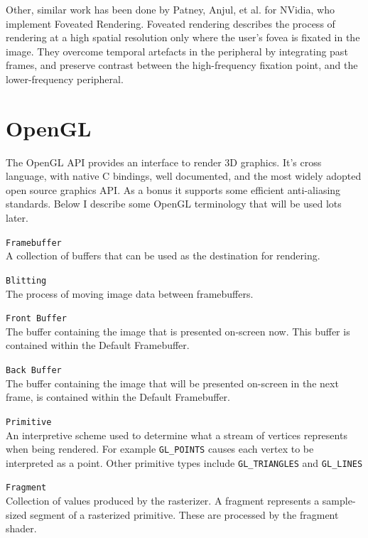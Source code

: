 \documentclass[12pt,a4paper,twoside,openright]{report}
\begin{document}
Other, similar work has been done by Patney, Anjul, et al. \cite{patney2016towards} for NVidia, who implement Foveated Rendering. Foveated rendering describes the process of rendering at a high spatial resolution only where the user's fovea is fixated in the image. They overcome temporal artefacts in the peripheral by integrating past frames, and preserve contrast between the high-frequency fixation point, and the lower-frequency peripheral.

\section{OpenGL}

The OpenGL API provides an interface to render 3D graphics. It's cross language, with native C bindings, well documented, and the most widely adopted open source graphics API. As a bonus it supports some efficient anti-aliasing standards. Below I describe some OpenGL terminology that will be used lots later.

\begin{description}

\item\texttt{Framebuffer} \\
  A collection of buffers that can be used as the destination for rendering.

\item\texttt{Blitting} \\
  The process of moving image data between framebuffers.

\item\texttt{Front Buffer} \\
  The buffer containing the image that is presented on-screen now. This buffer is contained within the Default Framebuffer.

\item\texttt{Back Buffer} \\
  The buffer containing the image that will be presented on-screen in the next frame, is contained within the Default Framebuffer. 

\item\texttt{Primitive} \\
  An interpretive scheme used to determine what a stream of vertices represents when being rendered. For example \texttt{GL\_POINTS} causes each vertex to be interpreted as a point. Other primitive types include \texttt{GL\_TRIANGLES} and \texttt{GL\_LINES}
\item\texttt{Fragment} \\
  Collection of values produced by the rasterizer. A fragment represents a sample-sized segment of a rasterized primitive. These are processed by the fragment shader. 
\end{description}
\end{document}
